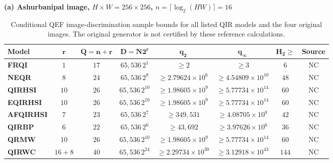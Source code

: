 \documentclass[11pt,a4paper]{article}
\begin{document}
{\begin{table}
\centering\color{red}
\caption{{\color{red}Conditional QEF image-discrimination sample bounds for all listed QIR models and the four original images. The original generator is not certified by these reference calculations.}}
\label{tab:qef_quantum_attack_resistance}
\vspace{0.25cm}
\textbf{(a) Ashurbanipal image, $H\times W=256\times256$, $n=\lceil\log_2(HW)\rceil=16$}\\[3pt]
{\footnotesize\setlength{\tabcolsep}{4pt}
\begin{tabular}{lccccccc}
\hline\rowcolor{Bisque3}
\textbf{Model} & $\boldsymbol{r}$ & $\boldsymbol{Q=n+r}$ & $\boldsymbol{D=N2^r}$ & $\boldsymbol{q_2}$ & $\boldsymbol{q_\infty}$ & $\boldsymbol{H_2\geq}$ & \textbf{Source}\\
\hline
\textbf{FRQI} & \(1\) & \(17\) & \(65{,}536\,2^{1}\) & $\geq 2$ & $\geq 3$ & \(6\) & NC \\
\textbf{NEQR} & \(8\) & \(24\) & \(65{,}536\,2^{8}\) & $\geq 2.79624\times10^{6}$ & $\geq 4.54809\times10^{10}$ & \(48\) & NC \\
\textbf{QIRHSI} & \(10\) & \(26\) & \(65{,}536\,2^{10}\) & $\geq 1.98605\times10^{9}$ & $\geq 5.77734\times10^{14}$ & \(60\) & NC \\
\textbf{EQIRHSI} & \(10\) & \(26\) & \(65{,}536\,2^{10}\) & $\geq 1.98605\times10^{9}$ & $\geq 5.77734\times10^{14}$ & \(60\) & NC \\
\textbf{AFQIRHSI} & \(7\) & \(23\) & \(65{,}536\,2^{7}\) & $\geq 349{,}531$ & $\geq 4.08705\times10^{8}$ & \(42\) & NC \\
\textbf{QIRBP} & \(6\) & \(22\) & \(65{,}536\,2^{6}\) & $\geq 43{,}692$ & $\geq 3.97626\times10^{6}$ & \(36\) & NC \\
\textbf{QRMW} & \(10\) & \(26\) & \(65{,}536\,2^{10}\) & $\geq 1.98605\times10^{9}$ & $\geq 5.77734\times10^{14}$ & \(60\) & NC \\
\textbf{QIRWC} & \(16+8\) & \(40\) & \(65{,}536\,2^{24}\) & $\geq 2.29734\times10^{30}$ & $\geq 3.12918\times10^{43}$ & \(144\) & NC \\
\hline\end{tabular}}\par


\end{table}}
\end{document}
